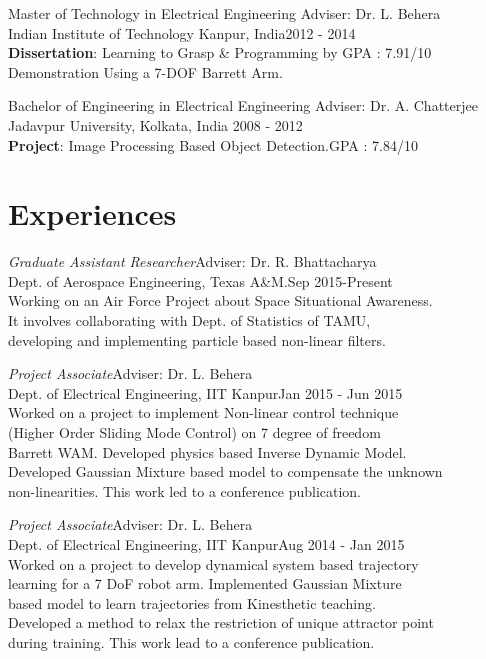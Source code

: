 \documentclass[margin,line]{resume}
\begin{document}
\begin{resume}
    \vspace{-2mm}	

	Master of Technology in Electrical Engineering \hfill Adviser: Dr. L. Behera\\
	Indian Institute of Technology Kanpur, India\hfill 2012 - 2014\\
	\textbf{Dissertation}: Learning to Grasp \& Programming by \hfill GPA : 7.91/10 \\Demonstration  
	Using a 7-DOF Barrett Arm. 

\vspace{-2mm}	

	Bachelor of Engineering in Electrical Engineering \hfill Adviser: Dr. A. Chatterjee \\
	Jadavpur University, Kolkata, India \hfill  2008 - 2012 \\
	\textbf{Project}: Image Processing Based Object Detection.\hfill GPA : 7.84/10

\section{\mysidestyle Experiences}
    
    \emph{Graduate Assistant  Researcher}\hfill Adviser: Dr. R. Bhattacharya\\
    Dept. of Aerospace Engineering, Texas A\&M.\hfill Sep 2015-Present\\
    Working on an Air Force Project about Space Situational Awareness. \\It involves collaborating with Dept. of Statistics of TAMU, \\developing and implementing particle based non-linear filters.
    
    \emph{Project Associate}\hfill Adviser: Dr. L. Behera\\
    Dept. of Electrical Engineering, IIT Kanpur\hfill Jan 2015 - Jun 2015\\
    Worked on a project to implement Non-linear control technique\\ (Higher Order Sliding Mode Control) on 7 degree of freedom \\Barrett WAM. Developed physics based Inverse Dynamic Model.\\ Developed Gaussian Mixture based model to compensate the unknown \\non-linearities. This work led to a conference publication. 
    
    \emph{Project Associate}\hfill Adviser: Dr. L. Behera\\
    Dept. of Electrical Engineering, IIT Kanpur\hfill Aug 2014 - Jan 2015\\
    Worked on a project to develop dynamical system based trajectory \\learning for a 7 DoF robot arm. Implemented Gaussian Mixture \\based model to learn trajectories from Kinesthetic teaching. \\Developed a method to relax the restriction of unique attractor point \\during training. This work lead to a conference publication.  
      

\end{resume}
\end{document}
